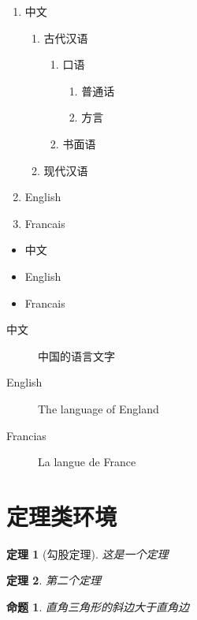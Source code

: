 \documentclass{ctexart}
\newcounter{mycnt}  %
\theoremstyle{marginbreak}
\newtheorem{thm}{定理}
\newtheorem{prop}[mycnt]{命题}
\begin{document}
\begin{enumerate}
	\item 中文
	\begin{enumerate}
		\item 古代汉语
		\begin{enumerate}
			\item 口语
			\begin{enumerate}
				\item 普通话
				\item 方言
			\end{enumerate}
			\item 书面语
		\end{enumerate}
		\item 现代汉语
	\end{enumerate}
	\item English
	\item Francais
\end{enumerate}

\begin{itemize}
	\item 中文
	\item English
	\item Francais
\end{itemize}

\begin{description}
	\item[中文] 中国的语言文字
	\item[English] The language of England
	\item[Francias] La langue de France
\end{description}

\section{定理类环境}	


\begin{thm}[勾股定理]
这是一个定理
\end{thm}
\begin{thm}
第二个定理
\end{thm}
\begin{prop}
直角三角形的斜边大于直角边
\end{prop}
\end{document}
